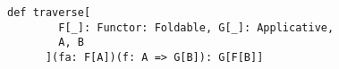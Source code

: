 \documentclass[include/preamble.tex]{subfiles}
\begin{document}
\begin{frame}[fragile]
  \begin{center}

    \begin{lstlisting}[style=scala]
      def traverse[
        F[_]: Functor: Foldable, G[_]: Applicative,
        A, B
      ](fa: F[A])(f: A => G[B]): G[F[B]]
    \end{lstlisting}

  \end{center}
\end{frame}
\end{document}
